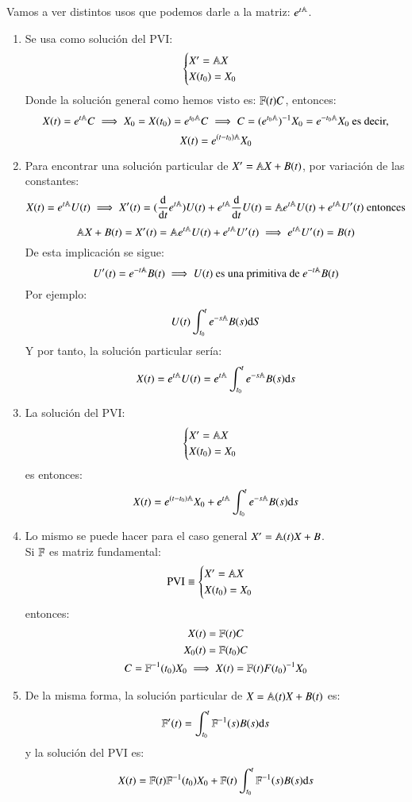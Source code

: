 Vamos a ver distintos usos que podemos darle a la matriz: $e^{t\mathbb{A}}$.
\begin{enumerate}
    \item Se usa como solución del PVI:
    $$
        \begin{cases}
            X' = \mathbb{A} X\\
            X(t_0) = X_0
        \end{cases}
    $$
    Donde la solución general como hemos visto es: $\mathbb{F}(t) C$, entonces:
    $$
        X(t) = e^{t\mathbb{A}} C \implies X_0 = X(t_0) = e^{t_0\mathbb{A}} C \implies C = (e^{t_0 \mathbb{A}})^{-1} X_0 = e^{-t_0\mathbb{A}} X_0 \text{ es decir,}
    $$
    $$
        X(t) = e^{(t-t_0)\mathbb{A}} X_0
    $$
    \item Para encontrar una solución particular de $X' = \mathbb{A} X + B(t)$, por variación de las constantes:
    $$
        X(t) = e^{t\mathbb{A}} U(t) \implies X'(t) = (\frac{\mathrm{d}}{\mathrm{d}t}e^{t\mathbb{A}})U(t) + e^{t\mathbb{A}} \frac{\mathrm{d}}{\mathrm{d}t}U(t) = \mathbb{A} e^{t\mathbb{A}} U(t) + e^{t\mathbb{A}}U'(t) \text{ entonces}
    $$
    $$
        \mathbb{A} X + B(t) = X'(t) = \mathbb{A} e^{t\mathbb{A}} U(t) + e^{t\mathbb{A}} U'(t) \implies e^{t\mathbb{A}}U'(t) = B(t)
    $$
    De esta implicación se sigue:
    $$
        U'(t) = e^{-t\mathbb{A}}B(t) \implies U(t) \text{ es una primitiva de } e^{-t\mathbb{A}}B(t)
    $$
    Por ejemplo:
    $$
        U(t) \int_{t_0}^t e^{-s\mathbb{A}}B(s)\mathrm{d} S
    $$
    Y por tanto, la solución particular sería:
    $$
        X(t) = e^{t \mathbb{A}}U(t) = e^{t\mathbb{A}} \int_{t_0}^t e^{-s\mathbb{A}}B(s)\mathrm{d} s
    $$
    \item La solución del PVI:
    $$
        \begin{cases}
            X' = \mathbb{A} X\\
            X(t_0) = X_0
        \end{cases}
    $$ es entonces:
    $$
        X(t) = e^{(t-t_0) \mathbb{A}}X_0 + e^{t\mathbb{A}} \int_{t_0}^t e^{-s\mathbb{A}}B(s)\mathrm{d} s
    $$
    \item Lo mismo se puede hacer para el caso general $X' = \mathbb{A}(t) X + B$.\\
    Si $\mathbb{F}$ es matriz fundamental:
    $$
        \text{PVI}\equiv \begin{cases}
            X' = \mathbb{A} X\\
            X(t_0) = X_0
        \end{cases}
    $$
    entonces:
    \begin{gather}
        X(t) = \mathbb{F}(t) C\\
        X_0(t) = \mathbb{F}(t_0) C\\
        C = \mathbb{F}^{-1}(t_0)X_0 \implies X(t) = \mathbb{F}(t) F(t_0)^{-1} X_0
    \end{gather}
    \item De la misma forma, la solución particular de $X = \mathbb{A}(t) X + B(t)$ es:
    $$
        \mathbb{F}'(t) = \int_{t_0}^{t} \mathbb{F}^{-1}(s) B(s) \mathrm{d} s
    $$
    y la solución del PVI es:
    $$
        X(t) = \mathbb{F}(t)\mathbb{F}^{-1}(t_0)X_0+\mathbb{F}(t)\int_{t_0}^{t} \mathbb{F}^{-1}(s) B(s) \mathrm{d} s
    $$
\end{enumerate}
